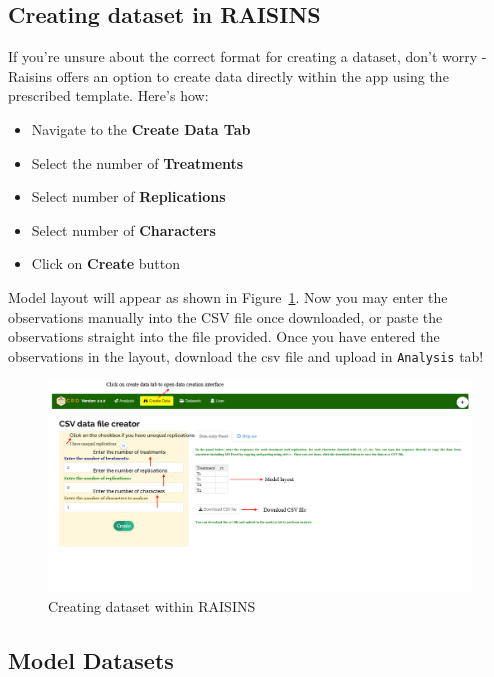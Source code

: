 \documentclass[
  letterpaper,
  DIV=11,
  numbers=noendperiod]{scrartcl}
\begin{document}
\hypertarget{sec-MSEXCEL}{%
\subsection{Creating dataset in RAISINS}\label{sec-MSEXCEL}}

If you're unsure about the correct format for creating a dataset, don't
worry - Raisins offers an option to create data directly within the app
using the prescribed template. Here's how:

\begin{itemize}
\item
  Navigate to the \textbf{Create Data Tab}
\item
  Select the number of \textbf{Treatments}
\item
  Select number of \textbf{Replications}
\item
  Select number of \textbf{Characters}
\item
  Click on \textbf{Create} button
\end{itemize}

Model layout will appear as shown in Figure~\ref{fig-createdata}. Now
you may enter the observations manually into the CSV file once
downloaded, or paste the observations straight into the file provided.
Once you have entered the observations in the layout, download the csv
file and upload in \texttt{Analysis} tab!

\begin{figure}

{\centering \includegraphics{CREATEDAT.webp}

}

\caption{\label{fig-createdata}Creating dataset within RAISINS}

\end{figure}

\hypertarget{sec-Mode}{%
\subsection{Model Datasets}\label{sec-Mode}}
\end{document}
